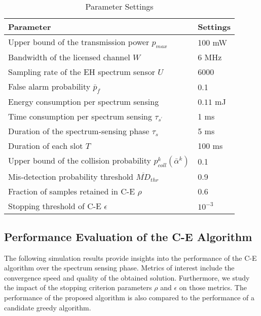 \documentclass[journal]{IEEEtran} \ifCLASSINFOpdf
\begin{document}
\begin{table}[!t]
    \caption{Parameter Settings}
    \centering
    \small
    \begin{tabular}{p{6.5cm}|p{1.3cm}}
         \hline
         \hline \textbf{Parameter} & \textbf{Settings} \\
         \hline
         \hline
         Upper bound of the transmission power $p_{max}$ & 100 mW\\
         Bandwidth of the licensed channel $W$ \cite{Zhang2014} & 6 MHz\\
         Sampling rate of the EH spectrum sensor $U$ \cite{Liang2008}  & 6000\\
         False alarm probability $\bar{p}_f$ & 0.1  \\
         Energy consumption per spectrum sensing  & $0.11$ mJ\\ Time consumption per spectrum sensing $\tau_{s^{'}}$   & 1 ms   \\
         Duration of the spectrum-sensing phase $\tau_s$   & 5 ms   \\
         Duration of each slot $T$ \cite{Pei2011} & 100 ms \\
         Upper bound of the collision probability $p_{coll}^k(\bar{\alpha}^{k})$ & 0.1 \\
         Mis-detection probability threshold $\overline{MD}_{thr}$ & 0.9 \\
         Fraction of samples retained in C-E $\rho$ & 0.6 \\
         Stopping threshold of C-E $\epsilon$ & $10^{-3}$ \\
         \hline
    \end{tabular}
    \label{table.parametersettings}
\end{table}

\subsection{Performance Evaluation of the C-E Algorithm}
The following simulation results provide insights into the performance of the C-E algorithm over the spectrum sensing phase. Metrics of interest include the convergence speed and quality of the obtained solution. Furthermore, we study the impact of the stopping criterion parameters $\rho$ and $\epsilon$ on those metrics. The performance of the proposed algorithm is also compared to the performance of a candidate greedy algorithm.
\end{document}
